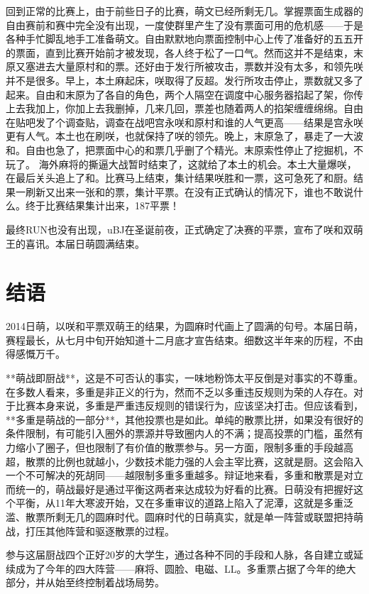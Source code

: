 回到正常的比赛上，由于前些日子的比赛，萌文已经所剩无几。掌握票面生成器的自由赛前和赛中完全没有出现，一度使群里产生了没有票面可用的危机感——于是各种手忙脚乱地手工准备萌文。自由默默地向票面控制中心上传了准备好的五五开的票面，直到比赛开始前才被发现，各人终于松了一口气。然而这并不是结束，末原又塞进去大量原村和的票。还好由于发行所被攻击，票数并没有太多，和领先咲并不是很多。早上，本土麻起床，咲取得了反超。发行所攻击停止，票数就又多了起来。自由和末原为了各自的角色，两个人隔空在调度中心服务器掐起了架，你传上去我加上，你加上去我删掉，几来几回，票差也随着两人的掐架缠缠绵绵。自由在贴吧发了个调查贴，调查在战吧宫永咲和原村和谁的人气更高——结果是宫永咲更有人气。本土也在刷咲，也就保持了咲的领先。晚上，末原急了，暴走了一大波和。自由也急了，把票面中心的和票几乎删了个精光。末原索性停止了挖掘机，不玩了。
海外麻将的撕逼大战暂时结束了，这就给了本土的机会。本土大量爆咲，在最后关头追上了和。比赛马上结束，集计结果咲胜和一票，这可急死了和厨。结果一刷新又出来一张和的票，集计平票。在没有正式确认的情况下，谁也不敢说什么。终于比赛结果集计出来，187平票！

最终RUN也没有出现，uBJ在圣诞前夜，正式确定了决赛的平票，宣布了咲和双萌王的喜讯。本届日萌圆满结束。

\section{结语}

2014日萌，以咲和平票双萌王的结果，为圆麻时代画上了圆满的句号。本届日萌，赛程最长，从七月中旬开始知道十二月底才宣告结束。细数这半年来的历程，不由得感慨万千。

**萌战即厨战**，这是不可否认的事实，一味地粉饰太平反倒是对事实的不尊重。在多数人看来，多重是非正义的行为，然而不乏以多重违反规则为荣的人存在。对于比赛本身来说，多重是严重违反规则的错误行为，应该坚决打击。但应该看到，**多重是萌战的一部分**，其他投票也是如此。单纯的散票比拼，如果没有很好的条件限制，有可能引入圈外的票源并导致圈内人的不满；提高投票的门槛，虽然有力缩小了圈子，但也限制了有价值的散票参与。另一方面，限制多重的手段越高超，散票的比例也就越小，少数技术能力强的人会主宰比赛，这就是厨。这会陷入一个不可解决的死胡同——越限制多重多重越多。辩证地来看，多重和散票是对立而统一的，萌战最好是通过平衡这两者来达成较为好看的比赛。日萌没有把握好这个平衡，从11年大寒波开始，又在多重审议的道路上陷入了泥潭，这就是多重泛滥、散票所剩无几的圆麻时代。圆麻时代的日萌真实，就是单一阵营或联盟把持萌战，打压其他阵营和驱逐散票的过程。

参与这届厨战四个正好20岁的大学生，通过各种不同的手段和人脉，各自建立或延续成为了今年的四大阵营——麻将、圆脸、电磁、LL。多重票占据了今年的绝大部分，并从始至终控制着战场局势。

